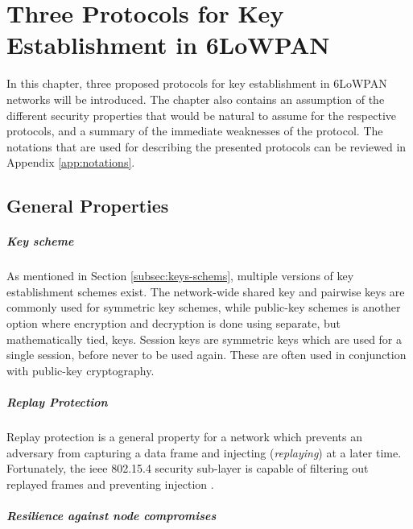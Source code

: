 \chapter{Three Protocols for Key Establishment in 6LoWPAN}
\label{chp:protocols}

In this chapter, three proposed protocols for key establishment in 6LoWPAN networks will be introduced. The chapter also contains an assumption of the different security properties that would be natural to assume for the respective protocols, and a summary of the immediate weaknesses of the protocol. The notations that are used for describing the presented protocols can be reviewed in Appendix \ref{app:notations}.


\section{General Properties}

\paragraph{Key scheme} As mentioned in Section \ref{subsec:keys-schems}, multiple versions of key establishment schemes exist. The network-wide shared key and pairwise keys are commonly used for symmetric key schemes, while public-key schemes is another option where encryption and decryption is done using separate, but mathematically tied, keys. Session keys are symmetric keys which are used for a single session, before never to be used again. These are often used in conjunction with public-key cryptography.

\paragraph{Replay Protection} Replay protection is a general property for a network which prevents an adversary from capturing a data frame and injecting (\emph{replaying}) at a later time. Fortunately, the \gls{ieee} 802.15.4 security sub-layer is capable of filtering out replayed frames and preventing injection \cite{krentz20136lowpan}.

\paragraph{Resilience against node compromises}

